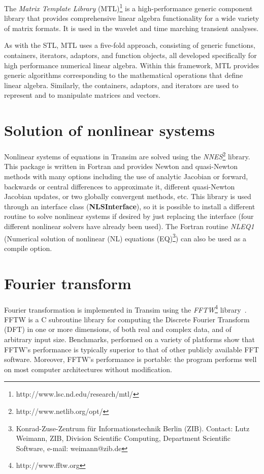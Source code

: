 The \emph{Matrix Template Library}
(MTL)\footnote{http://www.lsc.nd.edu/research/mtl/} is a
high-performance generic component library that provides comprehensive
linear algebra functionality for a wide variety of matrix formats. It
is used in the wavelet and time marching transient analyses.

As with the STL, MTL uses a five-fold approach, consisting of generic
functions, containers, iterators, adaptors, and function objects, all
developed specifically for high performance numerical linear
algebra. Within this framework, MTL provides generic algorithms
corresponding to the mathematical operations that define linear
algebra. Similarly, the containers, adaptors, and iterators are used
to represent and to manipulate matrices and vectors.

\section{Solution of nonlinear systems}

Nonlinear systems of equations in Transim are solved using the
\emph{NNES}\footnote{http://www.netlib.org/opt/} \cite{NNES}
library. This package is written in Fortran and provides Newton and
quasi-Newton methods with many options including the use of analytic
Jacobian or forward, backwards or central differences to approximate
it, different quasi-Newton Jacobian updates, or two globally
convergent methods, etc. This library is used through an interface
class ({\bf NLSInterface}), so it is possible to install a different
routine to solve nonlinear systems if desired by just replacing the
interface (four different nonlinear solvers have already been
used). The Fortran routine \emph{NLEQ1} (Numerical solution of
nonlinear (NL) equations (EQ)\footnote{Konrad-Zuse-Zentrum f\"ur
Informationstechnik Berlin (ZIB). Contact: Lutz Weimann, ZIB, Division
Scientific Computing, Department Scientific Software, e-mail:
weimann@zib.de}) can also be used as a compile option. 

\section{Fourier transform}

Fourier transformation is implemented in Transim using the
\emph{FFTW}\footnote{http://www.fftw.org} library~\cite{FFTW}. FFTW is
a C subroutine library for computing the Discrete Fourier Transform
(DFT) in one or more dimensions, of both real and complex data, and of
arbitrary input size. Benchmarks, performed on a variety of platforms
show that FFTW's performance is typically superior to that of other
publicly available FFT software. Moreover, FFTW's performance is
portable: the program performs well on most computer architectures
without modification.

